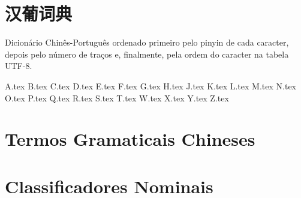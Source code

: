 \documentclass[a4paper,9pt,twoside,openany]{memoir}
\begin{document}



\clearpage
\pagestyle{empty}
\tableofcontents

\clearpage
\pagestyle{empty}
\chapter{汉葡词典}

%
%

Dicionário Chinês-Português ordenado primeiro pelo pinyin de cada
caracter, depois pelo número de traços e, finalmente, pela ordem do
caracter na tabela UTF-8.

\clearpage
\pagestyle{dicionario}
\begin{multicols}{2}
{A.tex}
{B.tex}
{C.tex}
{D.tex}
{E.tex}
{F.tex}
{G.tex}
{H.tex}
{J.tex}
{K.tex}
{L.tex}
{M.tex}
{N.tex}
{O.tex}
{P.tex}
{Q.tex}
{R.tex}
{S.tex}
{T.tex}
{W.tex}
{X.tex}
{Y.tex}
{Z.tex}
\end{multicols}

\clearpage
\pagestyle{plain}
\chapter{Termos Gramaticais Chineses}


\clearpage
\pagestyle{plain}
\chapter{Classificadores Nominais}

\end{document}
